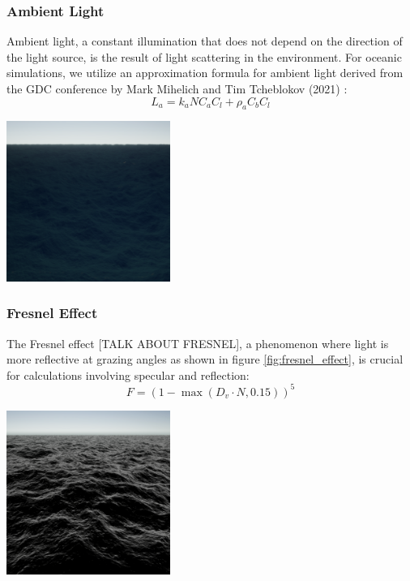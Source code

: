 \subsubsection{Ambient Light}
Ambient light, a constant illumination that does not depend on the direction of the light source, is the result of light scattering in the environment. For oceanic simulations, we utilize an approximation formula for ambient light derived from the GDC conference by Mark Mihelich and Tim Tcheblokov (2021) \cite{mark2021}: 
\begin{equation}
    L_a = k_a N C_a C_l + \rho_a C_b C_l
\end{equation}
\begin{minipage}{1\textwidth}
    \centering
    \includegraphics[width=0.40\textwidth]{"images/ambient_light.png"}
    \label{fig:ambient_light}
\end{minipage}

\subsubsection{Fresnel Effect}
The Fresnel effect [TALK ABOUT FRESNEL], a phenomenon where light is more reflective at grazing angles as shown in figure \ref{fig:fresnel_effect}, is crucial for calculations involving specular and reflection:
\begin{equation}
    F = (1 - \max(D_v \cdot N, 0.15))^{5}
\end{equation}
\begin{minipage}{1\textwidth}
    \centering
    \includegraphics[width=0.40\textwidth]{"images/fresnel.png"}
    \label{fig:fresnel_effect}
\end{minipage}

